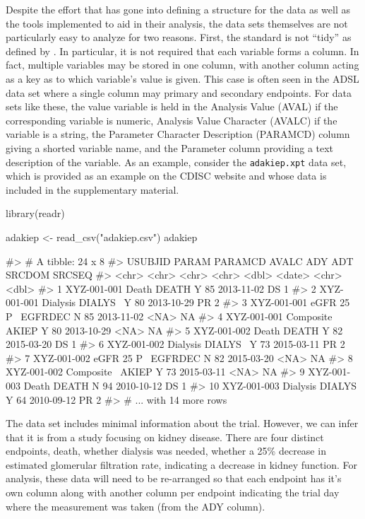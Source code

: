 Despite the effort that has gone into defining a structure for the data
as well as the tools implemented to aid in their analysis, the data sets
themselves are not particularly easy to analyze for two reasons. First,
the standard is not ``tidy'' as defined by \citet{wickham2014}. In
particular, it is not required that each variable forms a column. In
fact, multiple variables may be stored in one column, with another
column acting as a key as to which variable's value is given. This case
is often seen in the ADSL data set where a single column may primary and
secondary endpoints. For data sets like these, the value variable is
held in the Analysis Value (AVAL) if the corresponding variable is
numeric, Analysis Value Character (AVALC) if the variable is a string,
the Parameter Character Description (PARAMCD) column giving a shorted
variable name, and the Parameter column providing a text description of
the variable. As an example, consider the \texttt{adakiep.xpt} data set,
which is provided as an example on the CDISC website and whose data is
included in the supplementary material.

\begin{Schunk}
\begin{Sinput}
library(readr)

adakiep <- read_csv("adakiep.csv") 
adakiep
\end{Sinput}
\begin{Soutput}
#> # A tibble: 24 x 8
#>    USUBJID     PARAM      PARAMCD AVALC   ADY ADT        SRCDOM SRCSEQ
#>    <chr>       <chr>      <chr>   <chr> <dbl> <date>     <chr>   <dbl>
#>  1 XYZ-001-001 Death      DEATH   Y        85 2013-11-02 DS          1
#>  2 XYZ-001-001 Dialysis   DIALYS~ Y        80 2013-10-29 PR          2
#>  3 XYZ-001-001 eGFR 25 P~ EGFRDEC N        85 2013-11-02 <NA>       NA
#>  4 XYZ-001-001 Composite~ AKIEP   Y        80 2013-10-29 <NA>       NA
#>  5 XYZ-001-002 Death      DEATH   Y        82 2015-03-20 DS          1
#>  6 XYZ-001-002 Dialysis   DIALYS~ Y        73 2015-03-11 PR          2
#>  7 XYZ-001-002 eGFR 25 P~ EGFRDEC N        82 2015-03-20 <NA>       NA
#>  8 XYZ-001-002 Composite~ AKIEP   Y        73 2015-03-11 <NA>       NA
#>  9 XYZ-001-003 Death      DEATH   N        94 2010-10-12 DS          1
#> 10 XYZ-001-003 Dialysis   DIALYS~ Y        64 2010-09-12 PR          2
#> # ... with 14 more rows
\end{Soutput}
\end{Schunk}

The data set includes minimal information about the trial. However, we
can infer that it is from a study focusing on kidney disease. There are
four distinct endpoints, death, whether dialysis was needed, whether a
25\% decrease in estimated glomerular filtration rate, indicating a
decrease in kidney function. For analysis, these data will need to be
re-arranged so that each endpoint has it's own column along with another
column per endpoint indicating the trial day where the measurement was
taken (from the ADY column).

